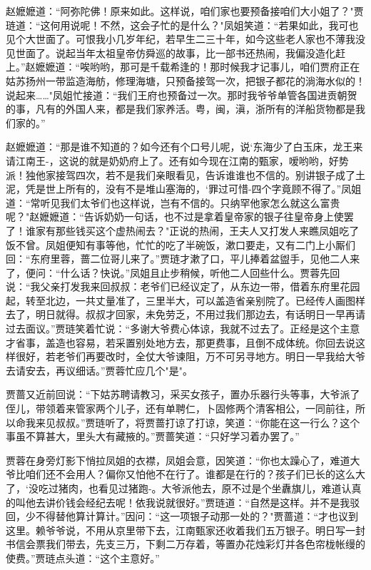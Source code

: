 赵嬷嬷道：“阿弥陀佛！原来如此。这样说，咱们家也要预备接咱们大小姐了？"贾琏道：“这何用说呢！不然，这会子忙的是什么？"凤姐笑道：“若果如此，我可也见个大世面了。可恨我小几岁年纪，若早生二三十年，如今这些老人家也不薄我没见世面了。说起当年太祖皇帝仿舜巡的故事，比一部书还热闹，我偏没造化赶上。”赵嬷嬷道：“唉哟哟，那可是千载希逢的！那时候我才记事儿，咱们贾府正在姑苏扬州一带监造海舫，修理海塘，只预备接驾一次，把银子都花的淌海水似的！说起来……"凤姐忙接道：“我们王府也预备过一次。那时我爷爷单管各国进贡朝贺的事，凡有的外国人来，都是我们家养活。粤，闽，滇，浙所有的洋船货物都是我们家的。”

赵嬷嬷道：“那是谁不知道的？如今还有个口号儿呢，说`东海少了白玉床，龙王来请江南王-，这说的就是奶奶府上了。还有如今现在江南的甄家，嗳哟哟，好势派！独他家接驾四次，若不是我们亲眼看见，告诉谁谁也不信的。别讲银子成了土泥，凭是世上所有的，没有不是堆山塞海的，`罪过可惜-四个字竟顾不得了。”凤姐道：“常听见我们太爷们也这样说，岂有不信的。只纳罕他家怎么就这么富贵呢？"赵嬷嬷道：“告诉奶奶一句话，也不过是拿着皇帝家的银子往皇帝身上使罢了！谁家有那些钱买这个虚热闹去？"正说的热闹，王夫人又打发人来瞧凤姐吃了饭不曾。凤姐便知有事等他，忙忙的吃了半碗饭，漱口要走，又有二门上小厮们回：“东府里蓉，蔷二位哥儿来了。”贾琏才漱了口，平儿捧着盆盥手，见他二人来了，便问：“什么话？快说。”凤姐且止步稍候，听他二人回些什么。贾蓉先回说：“我父亲打发我来回叔叔：老爷们已经议定了，从东边一带，借着东府里花园起，转至北边，一共丈量准了，三里半大，可以盖造省亲别院了。已经传人画图样去了，明日就得。叔叔才回家，未免劳乏，不用过我们那边去，有话明日一早再请过去面议。”贾琏笑着忙说：“多谢大爷费心体谅，我就不过去了。正经是这个主意才省事，盖造也容易，若采置别处地方去，那更费事，且倒不成体统。你回去说这样很好，若老爷们再要改时，全仗大爷谏阻，万不可另寻地方。明日一早我给大爷去请安去，再议细话。”贾蓉忙应几个"是"。

贾蔷又近前回说：“下姑苏聘请教习，采买女孩子，置办乐器行头等事，大爷派了侄儿，带领着来管家两个儿子，还有单聘仁，卜固修两个清客相公，一同前往，所以命我来见叔叔。”贾琏听了，将贾蔷打谅了打谅，笑道：“你能在这一行么？这个事虽不算甚大，里头大有藏掖的。”贾蔷笑道：“只好学习着办罢了。”

贾蓉在身旁灯影下悄拉凤姐的衣襟，凤姐会意，因笑道：“你也太躁心了，难道大爷比咱们还不会用人？偏你又怕他不在行了。谁都是在行的？孩子们已长的这么大了，`没吃过猪肉，也看见过猪跑-。大爷派他去，原不过是个坐纛旗儿，难道认真的叫他去讲价钱会经纪去呢！依我说就很好。”贾琏道：“自然是这样。并不是我驳回，少不得替他算计算计。”因问：“这一项银子动那一处的？"贾蔷道：“才也议到这里。赖爷爷说，不用从京里带下去，江南甄家还收着我们五万银子。明日写一封书信会票我们带去，先支三万，下剩二万存着，等置办花烛彩灯并各色帘栊帐缦的使费。”贾琏点头道：“这个主意好。”

